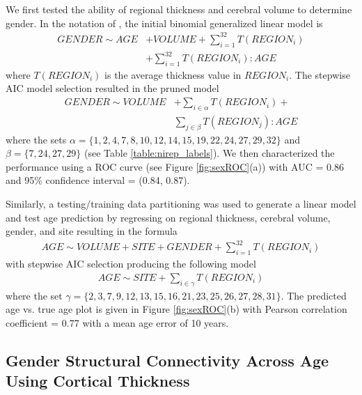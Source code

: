 We first tested the ability of regional thickness and cerebral volume to determine
gender.
In the notation of \cite{wilkinson1973}, the initial binomial 
generalized linear model is
\begin{align}
  GENDER \sim AGE &+ VOLUME + \sum_{i=1}^{32} T(REGION_{i}) \\ \nonumber
              &+\sum_{i=1}^{32} T(REGION_{i}):AGE
\end{align}
where $T(REGION_{i})$ is the average thickness value in $REGION_{i}$.
The stepwise AIC model selection resulted in the pruned model
\begin{align}
  \label{eq:roc}
  GENDER \sim VOLUME &+ \sum_{i \in \alpha} T(REGION_i) + \\ \nonumber 
                    & \sum_{j \in \beta} T(REGION_j):AGE
\end{align}
where the sets $\alpha = \{1,2,4,7,8,10,12,14,15,19,22,24,27,29,32\}$ and $\beta = \{7,24,27,29\}$ (see Table \ref{table:nirep_labels}).  We then characterized the performance using a ROC curve (see Figure \ref{fig:sexROC}(a)) with AUC = 0.86 and 95\% confidence interval = (0.84, 0.87). 
   
Similarly, a testing/training data partitioning was used to generate a linear model 
and test age prediction by regressing on regional thickness,
cerebral volume, gender, and site resulting in the formula
\begin{align}
  AGE \sim VOLUME + SITE + GENDER + \sum_{i=1}^{32} T(REGION_{i})
\end{align}
with stepwise AIC selection producing the following model
\begin{align}
  AGE \sim SITE + \sum_{i\in\gamma} T(REGION_{i})
\end{align}
where the set $\gamma = \{2,3,7,9,12,13,15,16, 21,23,25,26,27,28,31\}$.  The predicted age vs. true age plot is given
in Figure \ref{fig:sexROC}(b) with Pearson correlation coefficient = 0.77 with a mean
age error of 10 years.


\subsection{Gender Structural Connectivity Across Age Using Cortical Thickness}


